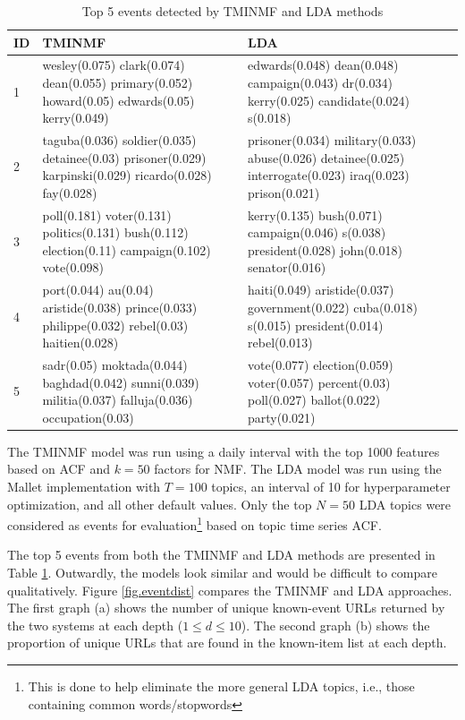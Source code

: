 \documentclass{sig-alternate}
\begin{document}
\begin{table}
\scriptsize
\begin{tabular}{| p{0.2cm} | p{3.5cm} | p{3.5cm} | } \hline
{\bf ID } & {\bf TMINMF} & {\bf LDA } \\ \hline
1 & wesley(0.075) clark(0.074) dean(0.055) primary(0.052) howard(0.05) edwards(0.05) kerry(0.049) & 
edwards(0.048) dean(0.048) campaign(0.043) dr(0.034) kerry(0.025) candidate(0.024) s(0.018)   \\ \hline
2 & taguba(0.036) soldier(0.035) detainee(0.03) prisoner(0.029) karpinski(0.029) ricardo(0.028) fay(0.028)   &
prisoner(0.034) military(0.033) abuse(0.026) detainee(0.025) interrogate(0.023) iraq(0.023) prison(0.021)  \\ \hline
3 & poll(0.181) voter(0.131) politics(0.131) bush(0.112) election(0.11) campaign(0.102) vote(0.098)  &
kerry(0.135) bush(0.071) campaign(0.046) s(0.038) president(0.028) john(0.018) senator(0.016) \\ \hline
4 & port(0.044) au(0.04) aristide(0.038) prince(0.033) philippe(0.032) rebel(0.03) haitien(0.028) &
haiti(0.049) aristide(0.037) government(0.022) cuba(0.018) s(0.015) president(0.014) rebel(0.013)  \\ \hline
5 & sadr(0.05) moktada(0.044) baghdad(0.042) sunni(0.039) militia(0.037) falluja(0.036) occupation(0.03)  &
vote(0.077) election(0.059) voter(0.057) percent(0.03) poll(0.027) ballot(0.022) party(0.021) \\ \hline
\end{tabular}
\caption{Top 5 events detected by TMINMF and LDA methods}
\label{table.top5}
\end{table}

The TMINMF model was run using a daily interval with the top 1000 features based on ACF and $k=50$ factors for NMF. The LDA model was run using the Mallet implementation with $T=100$ topics, an interval of 10 for hyperparameter optimization, and all other default values. Only the top $N=50$ LDA topics were considered as events for evaluation\footnote{This is done to help eliminate the more general LDA topics, i.e., those containing common words/stopwords} based on topic time series ACF.

The top 5 events from both the TMINMF and LDA methods are presented in Table \ref{table.top5}. Outwardly, the models look similar and would be difficult to compare qualitatively.  Figure \ref{fig.eventdist} compares the TMINMF and LDA approaches.  The first graph (a) shows the number of unique known-event URLs returned by the two systems at each depth ($1 \le d \le 10$).  The second graph (b) shows the proportion of unique URLs that are found in the known-item list  at each depth.
\end{document}
